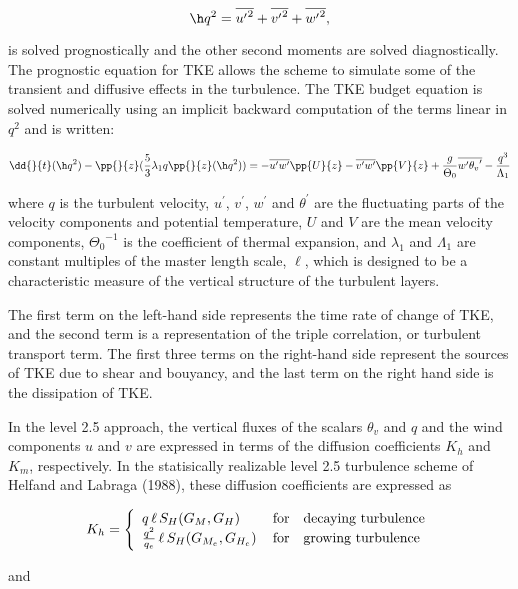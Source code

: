 \[ {\h}{q^2}={\overline{{u^{\prime}}^2}}+{\overline{{v^{\prime}}^2}}+{\overline{{w^{\prime}}^2}}, \]

is solved prognostically and the other second moments are solved diagnostically.
The prognostic equation for TKE allows the scheme to simulate 
some of the transient and diffusive effects in the turbulence. The TKE budget equation
is solved numerically using an implicit backward computation of the terms linear in $q^2$
and is written:

\[
{\dd{}{t} ({{\h} q^2})} - { \pp{}{z} ({ {5 \over 3} {{\lambda}_1} q { \pp {}{z} 
({\h}q^2)} })} =
{- \overline{{u^{\prime}}{w^{\prime}}} { \pp{U}{z} }} - {\overline{{v^{\prime}}{w^{\prime}}} 
{ \pp{V}{z} }} + {{g \over {\Theta_0}}{\overline{{w^{\prime}}{{{\theta}_v}^{\prime}}}} } 
- { q^3 \over {{\Lambda} _1} }
\]

where $q$ is the turbulent velocity, ${u^{\prime}}$, ${v^{\prime}}$, ${w^{\prime}}$ and 
${{\theta}^{\prime}}$ are the fluctuating parts of the velocity components and potential 
temperature, $U$ and $V$ are the mean velocity components, ${\Theta_0}^{-1}$ is the
coefficient of thermal expansion, and ${{\lambda}_1}$ and ${{\Lambda} _1}$ are constant
multiples of the master length scale, $\ell$, which is designed to be a characteristic measure
of the vertical structure of the turbulent layers.

The first term on the left-hand side represents the time rate of change of TKE, and
the second term is a representation of the triple correlation, or turbulent
transport term. The first three terms on the right-hand side represent the sources of
TKE due to shear and bouyancy, and the last term on the right hand side is the dissipation
of TKE.

In the level 2.5 approach, the vertical fluxes of the scalars $\theta_v$ and $q$ and the
wind components $u$ and $v$ are expressed in terms of the diffusion coefficients $K_h$ and
$K_m$, respectively.  In the statisically realizable level 2.5 turbulence scheme of Helfand
and Labraga (1988), these diffusion coefficients are expressed as

\[
K_h 
 = \left\{ \begin{array}{l@{\quad\mbox{for}\quad}l} q \, \ell \, S_H(G_M,G_H) \, & \mbox{decaying turbulence}
\\ { q^2 \over {q_e} } \, \ell \, S_{H}(G_{M_e},G_{H_e}) \, & \mbox{growing turbulence} \end{array} \right.
\]

and

